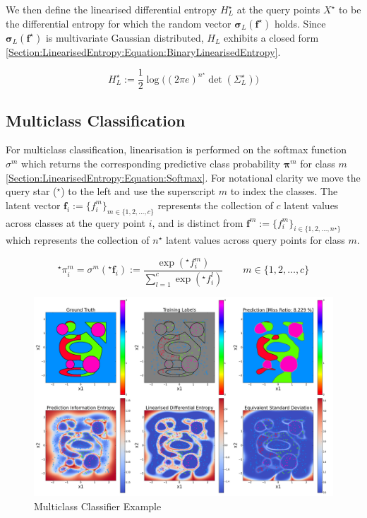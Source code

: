 \documentclass{article}
\renewcommand{\vec}[1]{\boldsymbol{#1}}
\begin{document}
			We then define the linearised differential entropy $H^{\star}_{L}$ at the query points $X^{\star}$ to be the differential entropy for which the random vector $\vec{\sigma}_{L}(\vec{f}^{\star})$ holds. Since $\vec{\sigma}_{L}(\vec{f}^{\star})$ is multivariate Gaussian distributed, $H_{L}$ exhibits a closed form \eqref{Section:LinearisedEntropy:Equation:BinaryLinearisedEntropy}.
			
			\begin{equation}
				H^{\star}_{L} := \frac{1}{2} \log\Big((2 \pi e)^{n^{\star}} \det(\Sigma^{\star}_{L})\Big)
			\label{Section:LinearisedEntropy:Equation:BinaryLinearisedEntropy}
			\end{equation}			
					
	\subsection{Multiclass Classification}
			
		For multiclass classification, linearisation is performed on the softmax function $\sigma^{m}$ which returns the corresponding predictive class probability $\vec{\pi}^{m}$ for class $m$ \eqref{Section:LinearisedEntropy:Equation:Softmax}. For notational clarity we move the query star ($^\star$) to the left and use the superscript $m$ to index the classes. The latent vector $\vec{f}_{i} := \{f^{m}_{i}\}_{m \in \{1, 2, \dots, c\}}$ represents the collection of $c$ latent values across classes at the query point $i$, and is distinct from $\vec{f}^{m} := \{f^{m}_{i}\}_{i \in \{1, 2, \dots, n^{\star}\}}$ which represents the collection of $n^{\star}$ latent values across query points for class $m$.

		\begin{equation}
			^{\star}\pi^{m}_{i} = \sigma^{m}(^{\star}\vec{f}_{i}) := \frac{\exp(^{\star}f^{m}_{i})}{\sum_{l = 1}^{c} \exp(^{\star}f^{l}_{i})} \qquad m \in \{1, 2, \dots, c\}
		\label{Section:LinearisedEntropy:Equation:Softmax}
		\end{equation}
			
		\begin{figure}[!htbp]
		\centering
			\includegraphics[width = \linewidth]{Figures/multiclass_linearised_entropy_horizontal/Figure1.png}
		\caption{Multiclass Classifier Example}
		\label{Figure:Results:MulticlassLinearisedEntropy}
		\end{figure}
		
\end{document}
